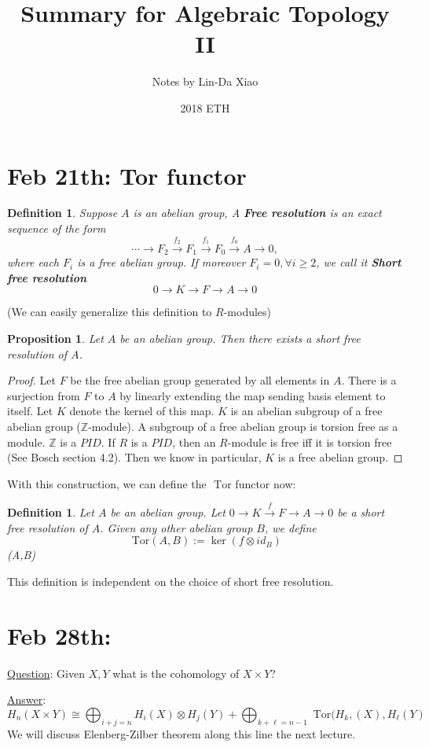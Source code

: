 \documentclass[11pt]{article}
\title{\bf Summary for Algebraic Topology II}
\author{Notes by Lin-Da Xiao}
\date{2018 ETH} %
\newtheorem{prop}[thm]{Proposition}
\newtheorem{dfn}[thm]{Definition}
\newcommand{\tor}{\text{ Tor}}
\newcommand{\intg}{\mathbb Z}
\newcommand{\rta}{\rightarrow}
\newcommand{\lrta}{\longrightarrow}
\begin{document}
\maketitle
\tableofcontents
\newpage
\section{Feb 21th: Tor functor}
\begin{dfn}
Suppose $A$ is an abelian group, A \textbf{Free resolution} is an exact sequence of the form
$$
\cdots\lrta F_2\overset{f_2}{\lrta}F_1\overset{f_1}{\lrta}F_0\overset{f_0}{\lrta}A\lrta 0,
$$
where each $F_i$ is a free abelian group. If moreover $F_i=0,\forall i\geq 2$, we call it \textbf{Short free resolution} 
$$
0\lrta K\lrta F\lrta A\lrta 0
$$
\end{dfn}
(We can easily generalize this definition to $R$-modules)
\begin{prop}
Let $A$ be an abelian group. Then there exists a short free resolution of $A$.
\end{prop}
\begin{proof}
Let $F$ be the free abelian group generated by all elements in $A$. There is a surjection from $F$ to $A$ by linearly extending the map sending basis element to itself. Let $K$ denote the kernel of this map. $K$ is an abelian subgroup of a free abelian group ($\intg$-module).  A subgroup of a free abelian group is torsion free as a module. $\intg$ is a $PID$. If $R$ is a $PID$, then an  $R$-module is free iff it is torsion free (See Bosch section 4.2). Then we know in particular, $K$ is a free abelian group.
\end{proof}
With this construction, we can define the $\tor$ functor now:
\begin{dfn}
Let $A$ be an abelian group. Let $0\rta K\overset{f}{\rta}F\rta A\rta 0$ be a short free resolution of $A$. Given any other abelian group $B$, we define 
$$
\tor(A,B):=\ker(f\otimes id_B)
$$
\tor(A,B)
\end{dfn}

This definition is independent on the choice of short free resolution.

\section{Feb 28th:}

\underline{Question}: Given $X, Y$ what is the cohomology of $X\times Y$?

\underline{Answer}:
$$
H_n(X\times Y)\cong \bigoplus_{i+j=n}H_i(X)\otimes H_j (Y)+\bigoplus_{k+\ell=n-1} \tor(H_k,(X),H_\ell(Y)
$$
We will discuss Elenberg-Zilber theorem along this line the next lecture.
\end{document}
